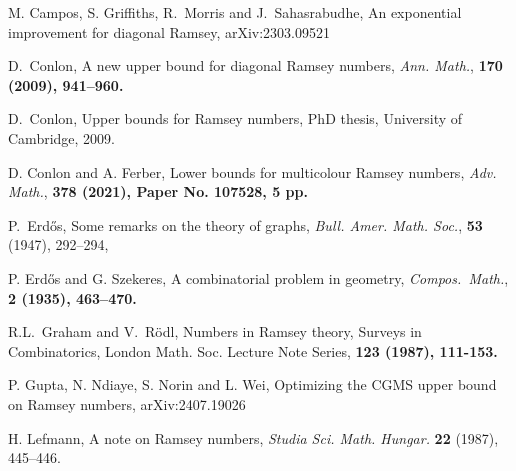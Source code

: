 \begin{thebibliography}{9}



 M. Campos, S. Griffiths, R.~Morris and J.~Sahasrabudhe, 
An exponential improvement for diagonal Ramsey, arXiv:2303.09521

 D.~Conlon, 
A new upper bound for diagonal Ramsey numbers, 
\emph{Ann. Math.},  \bf 170 \rm (2009), 941--960.

 D.~Conlon, 
Upper bounds for Ramsey numbers, 
PhD thesis, University of Cambridge, 2009.


 D. Conlon and A. Ferber, 
Lower bounds for multicolour Ramsey numbers, 
\emph{Adv. Math.}, \bf 378 \rm (2021), Paper No. 107528, 5 pp.




 P.~Erd\H{o}s, 
Some remarks on the theory of graphs, 
\emph{Bull. Amer. Math. Soc.}, \textbf{53} (1947), 292--294,

 P. Erd\H{o}s and G. Szekeres, 
A combinatorial problem in geometry, 
\emph{Compos.~Math.}, \bf 2 \rm (1935), 463--470.

 R.L.~Graham and V.~R\"odl, 
Numbers in Ramsey theory, 
Surveys in Combinatorics, London Math. Soc. Lecture Note Series, \bf 123 \rm (1987), 111-153.

 P. Gupta, N. Ndiaye, S. Norin and L. Wei, Optimizing the CGMS upper bound on Ramsey numbers, arXiv:2407.19026

 H. Lefmann, A note on Ramsey numbers, 
\emph{Studia Sci. Math. Hungar.} \textbf{22} (1987), 445--446.


\end{thebibliography}
